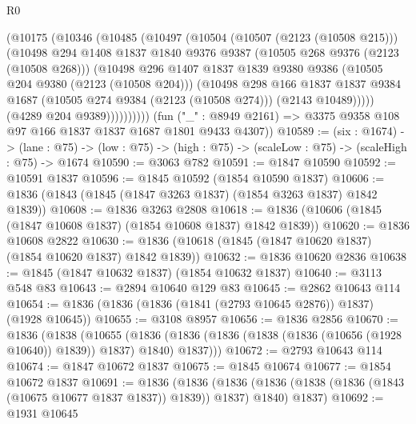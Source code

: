 \begin{lexlean}{R0}
\begin{coremodule}
                (@10175
                  (@10346
                    (@10485
                      (@10497
                        (@10504
                          (@10507 (@2123 (@10508 @215)))
                          (@10498
                            @294
                            @1408
                            @1837
                            @1840
                            @9376
                            @9387
                            (@10505 @268 @9376 (@2123 (@10508 @268)))
                            (@10498
                              @296
                              @1407
                              @1837
                              @1839
                              @9380
                              @9386
                              (@10505 @204 @9380 (@2123 (@10508 @204)))
                              (@10498
                                @298
                                @166
                                @1837
                                @1837
                                @9384
                                @1687
                                (@10505 @274 @9384 (@2123 (@10508 @274)))
                                (@2143 @10489)))))
                        (@4289 @204 @9389))))))))))
      (fun ("_" : @8949 @2161) => @3375 @9358 @108 @97 @166 @1837 @1837 @1687 @1801 @9433 @4307))
@10589 := (six : @1674) ->
  (lane : @75) -> (low : @75) -> (high : @75) -> (scaleLow : @75) -> (scaleHigh : @75) -> @1674
@10590 := @3063 @782
@10591 := @1847 @10590
@10592 := @10591 @1837
@10596 := @1845 @10592 (@1854 @10590 @1837)
@10606 := @1836 (@1843 (@1845 (@1847 @3263 @1837) (@1854 @3263 @1837) @1842 @1839))
@10608 := @1836 @3263 @2808
@10618 := @1836 (@10606 (@1845 (@1847 @10608 @1837) (@1854 @10608 @1837) @1842 @1839))
@10620 := @1836 @10608 @2822
@10630 := @1836 (@10618 (@1845 (@1847 @10620 @1837) (@1854 @10620 @1837) @1842 @1839))
@10632 := @1836 @10620 @2836
@10638 := @1845 (@1847 @10632 @1837) (@1854 @10632 @1837)
@10640 := @3113 @548 @83
@10643 := @2894 @10640 @129 @83
@10645 := @2862 @10643 @114
@10654 := @1836 (@1836 (@1836 (@1841 (@2793 @10645 @2876)) @1837) (@1928 @10645))
@10655 := @3108 @8957
@10656 := @1836 @2856
@10670 := @1836
    (@1838
      (@10655
        (@1836 (@1836 (@1836 (@1838 (@1836 (@10656 (@1928 @10640)) @1839)) @1837) @1840) @1837)))
@10672 := @2793 @10643 @114
@10674 := @1847 @10672 @1837
@10675 := @1845 @10674
@10677 := @1854 @10672 @1837
@10691 := @1836
    (@1836
      (@1836 (@1836 (@1838 (@1836 (@1843 (@10675 @10677 @1837 @1837)) @1839)) @1837) @1840)
      @1837)
@10692 := @1931 @10645

\end{coremodule}
\end{lexlean}
